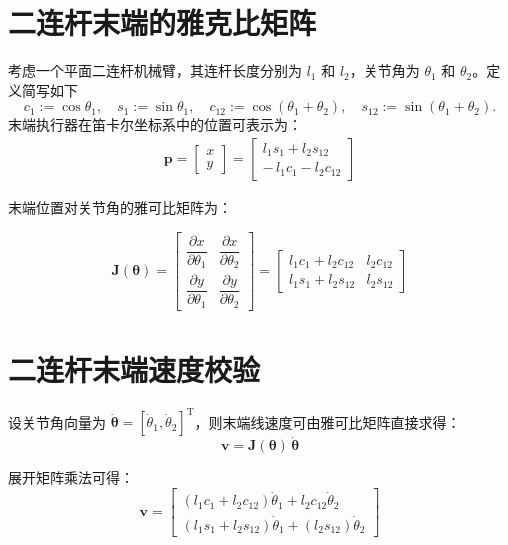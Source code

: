 \documentclass{ctexart}
\begin{document}
\section*{二连杆末端的雅克比矩阵}

考虑一个平面二连杆机械臂，其连杆长度分别为 $l_1$ 和 $l_2$，关节角为 $\theta_1$ 和 $\theta_2$。定义简写如下
\[
  c_1 := \cos\theta_1, \quad s_1 := \sin\theta_1, \quad
  c_{12} := \cos(\theta_1+\theta_2), \quad s_{12} := \sin(\theta_1+\theta_2).
\]
末端执行器在笛卡尔坐标系中的位置可表示为：
\begin{align*}
  \boldsymbol{p} = \begin{bmatrix} x \\ y \end{bmatrix} =
  \begin{bmatrix} l_1 s_1 + l_2 s_{12} \\ -\,l_1 c_1 - l_2 c_{12} \end{bmatrix}
\end{align*}

末端位置对关节角的雅可比矩阵为：

\begin{equation*}
  \boldsymbol{J}(\boldsymbol{\theta}) =
  \begin{bmatrix}
    \dfrac{\partial x}{\partial \theta_1} & \dfrac{\partial x}{\partial \theta_2} \\
    \dfrac{\partial y}{\partial \theta_1} & \dfrac{\partial y}{\partial \theta_2}
  \end{bmatrix}=
  \begin{bmatrix}
    l_1 c_1 + l_2 c_{12} & l_2 c_{12} \\
    l_1 s_1 + l_2 s_{12} & l_2 s_{12}
  \end{bmatrix}
\end{equation*}

\section*{二连杆末端速度校验}

设关节角向量为 $\boldsymbol{\dot{\theta}} = [\dot{\theta}_1, \dot{\theta}_2]^\mathrm{T}$，则末端线速度可由雅可比矩阵直接求得：
\begin{equation*}
  \boldsymbol{v} = \boldsymbol{J}(\boldsymbol{\theta})\, \boldsymbol{\dot{\theta}}
\end{equation*}

展开矩阵乘法可得：
\begin{equation*}
  \boldsymbol{v} =
  \begin{bmatrix}
    (l_1 c_1 + l_2 c_{12}) \dot{\theta}_1 + l_2 c_{12} \dot{\theta}_2 \\
    (l_1 s_1 + l_2 s_{12}) \dot{\theta}_1 + (l_2 s_{12}) \dot{\theta}_2
  \end{bmatrix}
\end{equation*}
\end{document}
